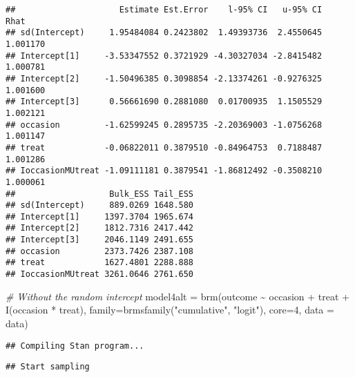 \documentclass[
]{article}
\newenvironment{Shaded}{\begin{snugshade}}{\end{snugshade}}
\newcommand{\AttributeTok}[1]{\textcolor[rgb]{0.77,0.63,0.00}{#1}}
\newcommand{\CommentTok}[1]{\textcolor[rgb]{0.56,0.35,0.01}{\textit{#1}}}
\newcommand{\DecValTok}[1]{\textcolor[rgb]{0.00,0.00,0.81}{#1}}
\newcommand{\FunctionTok}[1]{\textcolor[rgb]{0.00,0.00,0.00}{#1}}
\newcommand{\NormalTok}[1]{#1}
\newcommand{\OtherTok}[1]{\textcolor[rgb]{0.56,0.35,0.01}{#1}}
\newcommand{\SpecialCharTok}[1]{\textcolor[rgb]{0.00,0.00,0.00}{#1}}
\newcommand{\StringTok}[1]{\textcolor[rgb]{0.31,0.60,0.02}{#1}}
\begin{document}
\begin{verbatim}
##                     Estimate Est.Error    l-95% CI   u-95% CI     Rhat
## sd(Intercept)     1.95484084 0.2423802  1.49393736  2.4550645 1.001170
## Intercept[1]     -3.53347552 0.3721929 -4.30327034 -2.8415482 1.000781
## Intercept[2]     -1.50496385 0.3098854 -2.13374261 -0.9276325 1.001600
## Intercept[3]      0.56661690 0.2881080  0.01700935  1.1505529 1.002121
## occasion         -1.62599245 0.2895735 -2.20369003 -1.0756268 1.001147
## treat            -0.06822011 0.3879510 -0.84964753  0.7188487 1.001286
## IoccasionMUtreat -1.09111181 0.3879541 -1.86812492 -0.3508210 1.000061
##                   Bulk_ESS Tail_ESS
## sd(Intercept)     889.0269 1648.580
## Intercept[1]     1397.3704 1965.674
## Intercept[2]     1812.7316 2417.442
## Intercept[3]     2046.1149 2491.655
## occasion         2373.7426 2387.108
## treat            1627.4801 2288.888
## IoccasionMUtreat 3261.0646 2761.650
\end{verbatim}

\begin{Shaded}
\begin{Highlighting}[]
\CommentTok{\# Without the random intercept}
\NormalTok{model4alt }\OtherTok{=} \FunctionTok{brm}\NormalTok{(outcome }\SpecialCharTok{\textasciitilde{}}\NormalTok{ occasion }\SpecialCharTok{+}\NormalTok{ treat }\SpecialCharTok{+} \FunctionTok{I}\NormalTok{(occasion }\SpecialCharTok{*}\NormalTok{ treat), }\AttributeTok{family=}\FunctionTok{brmsfamily}\NormalTok{(}\StringTok{"cumulative"}\NormalTok{, }\StringTok{"logit"}\NormalTok{), }\AttributeTok{core=}\DecValTok{4}\NormalTok{, }\AttributeTok{data =}\NormalTok{ data)}
\end{Highlighting}
\end{Shaded}

\begin{verbatim}
## Compiling Stan program...
\end{verbatim}

\begin{verbatim}
## Start sampling
\end{verbatim}

\begin{Shaded}
\end{Shaded}
\end{document}
